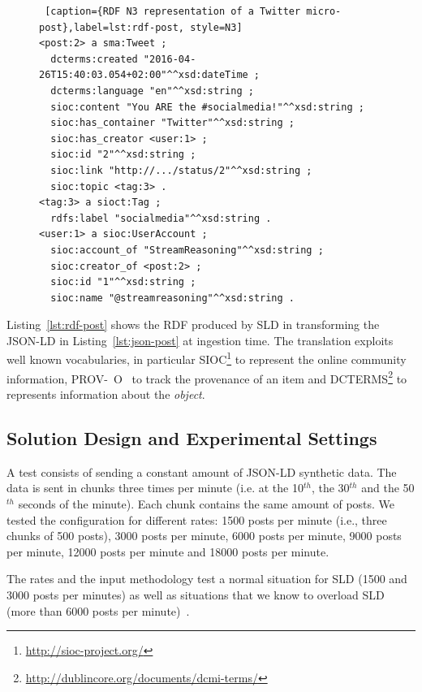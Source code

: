 {\begin{figure}[ht]
\begin{minipage}{0.95\linewidth}
\begin{lstlisting} [caption={RDF N3 representation of a Twitter micro-post},label=lst:rdf-post, style=N3]
<post:2> a sma:Tweet ;
  dcterms:created "2016-04-26T15:40:03.054+02:00"^^xsd:dateTime ;
  dcterms:language "en"^^xsd:string ;
  sioc:content "You ARE the #socialmedia!"^^xsd:string ;
  sioc:has_container "Twitter"^^xsd:string ;
  sioc:has_creator <user:1> ;
  sioc:id "2"^^xsd:string ;
  sioc:link "http://.../status/2"^^xsd:string ;
  sioc:topic <tag:3> .
<tag:3> a sioct:Tag ;
  rdfs:label "socialmedia"^^xsd:string .
<user:1> a sioc:UserAccount ;
  sioc:account_of "StreamReasoning"^^xsd:string ;
  sioc:creator_of <post:2> ;
  sioc:id "1"^^xsd:string ;
  sioc:name "@streamreasoning"^^xsd:string .
\end{lstlisting}
\end{minipage}
\end{figure}

Listing~\ref{lst:rdf-post} shows the RDF produced by SLD in transforming the JSON-LD in Listing~\ref{lst:json-post} at ingestion time. The translation exploits well known vocabularies, in particular SIOC\footnote{\url{http://sioc-project.org/}} to represent the online community information, PROV-~O~\cite{w3c-prov-o} to track the provenance of an item and DCTERMS\footnote{\url{http://dublincore.org/documents/dcmi-terms/}} to represents information about the \textit{object}.

\subsection{Solution Design and Experimental Settings} 
A test consists of sending a constant amount of JSON-LD synthetic data.
The data is sent in chunks three times per minute (i.e. at the 10$^{th}$, the 30$^{th}$ and the 50$^{th}$ seconds of the minute).  Each chunk contains the same amount of posts. We tested the configuration for different rates: 1500 posts per minute (i.e., three chunks of 500 posts), 3000 posts per minute, 6000 posts per minute, 9000 posts per minute, 12000 posts per minute and 18000 posts per minute.

The rates and the input methodology test a normal situation for SLD (1500 and 3000 posts per minutes) as well as situations that we know to overload SLD (more than 6000 posts per minute)~\cite{DBLP:conf/esws/BalduiniV017a}.

}
